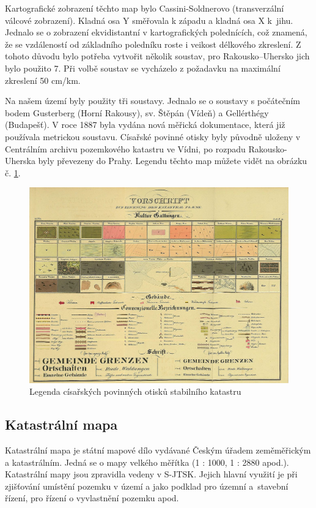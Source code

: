 \documentclass[thesis=M,czech]{FITthesis}[2012/06/26]
\begin{document}
Kartografické zobrazení těchto map bylo Cassini-Soldnerovo (transverzální válcové zobrazení). Kladná osa Y směřovala k západu a kladná osa X k~jihu. Jednalo se o zobrazení ekvidistantní v kartografických polednících, což znamená, že se vzdáleností od základního poledníku roste i veikost délkového zkreslení. Z tohoto důvodu bylo potřeba vytvořit několik soustav, pro Rakousko–Uhersko jich bylo použito 7. Při volbě soustav se vycházelo z požadavku na maximální zkreslení 50 cm/km. 

Na našem území byly použity tři soustavy. Jednalo se o soustavy s počátečním bodem Gusterberg (Horní Rakousy), sv. Štěpán (Vídeň) a Gellérthégy (Budapešť). V roce 1887 byla vydána nová měřická dokumentace, která již používala metrickou soustavu. Císařské povinné otisky byly původně uloženy v Centrálním archivu pozemkového katastru ve Vídni, po rozpadu Rakousko-Uherska byly převezeny do Prahy. Legendu těchto map můžete vidět na obrázku č. \ref{obrazek:legenda}. \cite{mapko}


\begin{figure}[h]
	\centering
	\includegraphics[width=13cm]{pics/legenda_CPO.png}
	\caption{Legenda císařských povinných otisků stabilního katastru}
	\label{obrazek:legenda}
\end{figure}

\subsection{Katastrální mapa}
Katastrální mapa je státní mapové dílo vydávané Českým úřadem zeměměřickým a katastrálním. Jedná se o mapy velkého měřítka (1 : 1000, 1 : 2880 apod.). Katastrální mapy jsou zpravidla vedeny v S-JTSK. Jejich hlavní využití je při zjišťování umístění pozemku v území a jako podklad pro územní a~stavební řízení, pro řízení o vyvlastnění pozemku apod. 
\end{document}
